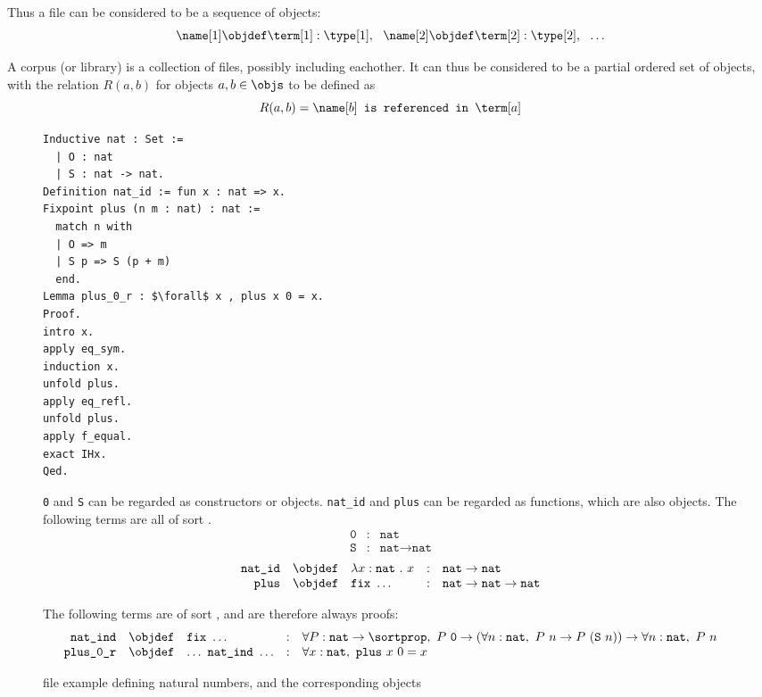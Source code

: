 Thus a \coq file can be considered to be a sequence of \coq objects:
$$ \name[1] \objdef \term[1] : \type[1], ~~ \name[2] \objdef \term[2] : \type[2], ~~ \ldots $$

A \coq corpus (or library) is a collection of \coq files, possibly including eachother.
It can thus be considered to be a partial ordered set of \coq objects, with the relation $R(a,b)$ for \coq objects $a, b \in \objs$ to be defined as
\[R(a,b) = \name[b] \texttt{~is referenced in~} \term[a]\]

\begin{figure}[H]
	\begin{lstlisting}[language=Coq, mathescape]
Inductive nat : Set :=
  | O : nat
  | S : nat -> nat.
Definition nat_id := fun x : nat => x.
Fixpoint plus (n m : nat) : nat :=
  match n with
  | O => m
  | S p => S (p + m)
  end.
Lemma plus_0_r : $\forall$ x , plus x 0 = x.
Proof.
intro x.
apply eq_sym.
induction x.
unfold plus.
apply eq_refl.
unfold plus.
apply f_equal.
exact IHx.
Qed.
	\end{lstlisting}
	\texttt{0} and \texttt{S} can be regarded as constructors or objects. \texttt{nat\_id} and \texttt{plus} can be regarded as functions, which are also objects.
	The following terms are all of sort \sortset.
	$$
		\begin{array}{rcl}
			\texttt{0} & : & \texttt{nat} \\
			\texttt{S} & : & \texttt{nat} \rightarrow \texttt{nat}
		\end{array}
	$$
	$$
		\begin{array}{rclcl}
			\texttt{nat\_id} & \objdef & \lambda x : \texttt{nat}~.~x & : & \texttt{nat} \rightarrow \texttt{nat} \\
			\texttt{plus} & \objdef & \texttt{fix}~\ldots & : & \texttt{nat} \rightarrow \texttt{nat} \rightarrow \texttt{nat} \\
		\end{array}
	$$

	The following terms are of sort \sortprop, and are therefore always proofs:
	$$
		\begin{array}{rclcl}
			\texttt{nat\_ind} & \objdef & \texttt{fix}~\ldots & : &
				\forall P : \texttt{nat} \rightarrow \sortprop,~
				P~\texttt{0} \rightarrow (\forall n : \texttt{nat},~ P~n \rightarrow P~(\texttt{S}~n)) \rightarrow \forall n : \texttt{nat},~ P~n \\
			\texttt{plus\_0\_r} & \objdef & \ldots~\texttt{nat\_ind}~\ldots & : & \forall x : \texttt{nat},~ \texttt{plus}~x~0 = x
		\end{array}
	$$
	\caption{\coq file example defining natural numbers, and the corresponding \coq objects}
	\label{figure:natexample}
\end{figure}
